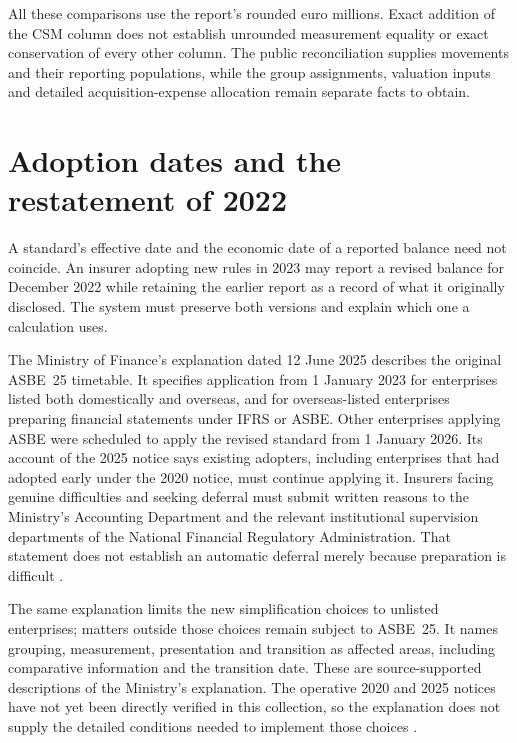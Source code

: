 All these comparisons use the report's rounded euro millions. Exact addition
of the CSM column does not establish unrounded measurement equality or
exact conservation of every other column. The public reconciliation supplies
movements and their reporting populations, while the group assignments,
valuation inputs and detailed acquisition-expense allocation remain separate
facts to obtain.

\clearpage
\section{Adoption dates and the restatement of 2022}
\label{sec:insurance-adoption}

A standard's effective date and the economic date of a reported balance need
not coincide. An insurer adopting new rules in 2023 may report a revised
balance for December 2022 while retaining the earlier report as a record of
what it originally disclosed. The system must preserve both versions and
explain which one a calculation uses.

The Ministry of Finance's explanation dated 12 June 2025 describes the original
ASBE~25 timetable. It specifies application from 1 January 2023 for enterprises
listed both domestically and overseas, and for overseas-listed enterprises
preparing financial statements under IFRS or ASBE. Other enterprises applying
ASBE were scheduled to apply the revised standard from 1 January 2026.
Its account of the
2025 notice says existing adopters, including enterprises that had adopted
early under the 2020 notice, must continue applying it. Insurers facing genuine
difficulties and seeking deferral must submit written reasons to the Ministry's
Accounting Department and the relevant institutional supervision departments
of the National Financial Regulatory Administration. That statement does not
establish an automatic deferral merely because preparation is difficult
\citep[answers on background and implementation arrangements]{mofinsurance2025qa}.

The same explanation limits the new simplification choices to unlisted
enterprises; matters outside those choices remain subject to ASBE~25. It names
grouping, measurement, presentation and transition as affected areas, including
comparative information and the transition date. These are source-supported
descriptions of the Ministry's explanation. The operative 2020 and 2025 notices
have not yet been directly verified in this collection, so the explanation
does not supply the detailed conditions needed to implement those choices
\citep[answer on the relationship between the notice and the standard]{mofinsurance2025qa}.

